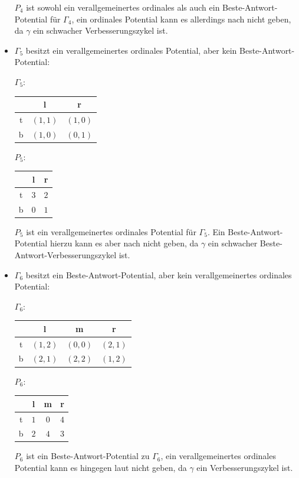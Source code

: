 \begin{bsp}
\begin{itemize}
\begin{center}
\begin{tabular}{c||c|c|c}
				\end{tabular}
			\end{center}
			$P_4$ ist sowohl ein verallgemeinertes ordinales als auch ein Beste-Antwort-Potential für $\Gamma_4$, ein ordinales Potential kann es allerdings nach  nicht geben, da $\gamma$ ein schwacher Verbesserungszykel ist.
		\item $\Gamma_5$ besitzt ein verallgemeinertes ordinales Potential, aber kein Beste-Antwort-Potential:
			\begin{center}
				$\Gamma_5:$ \quad
				\begin{tabular}{c||c|c}
						& l 		& r 		\\\hline\hline
					t	& $(1,1)$	& $(1,0)$	\\\hline
					b	& $(1,0)$	& $(0,1)$ 
				\end{tabular}\hspace{5em}
				$P_5:$ \quad
				\begin{tabular}{c||c|c}
						& l 		& r 		\\\hline\hline
					t	& $3$	& $2$			\\\hline
					b	& $0$	& $1$ 
				\end{tabular}
			\end{center}
		$P_5$ ist ein verallgemeinertes ordinales Potential für $\Gamma_5$. Ein Beste-Antwort-Potential hierzu kann es aber nach  nicht geben, da $\gamma$ ein schwacher Beste-Antwort-Verbesserungszykel ist.
		\item $\Gamma_6$ besitzt ein Beste-Antwort-Potential, aber kein verallgemeinertes ordinales Potential:
			\begin{center}
				$\Gamma_6:$ \quad
				\begin{tabular}{c||c|c|c}
						& l 		& m			& r 		\\\hline\hline
					t	& $(1,2)$	& $(0,0)$	& $(2,1)$	\\\hline
					b	& $(2,1)$	& $(2,2)$ 	& $(1,2)$
				\end{tabular}\hspace{5em}
				$P_6:$ \quad
				\begin{tabular}{c||c|c|c}
						& l 		& m 		& r \\\hline\hline
					t	& $1$	& $0$		& $4$	\\\hline
					b	& $2$	& $4$ 		& $3$
				\end{tabular}
			\end{center}
			$P_6$ ist ein Beste-Antwort-Potential zu $\Gamma_6$, ein verallgemeinertes ordinales Potential kann es hingegen laut  nicht geben, da $\gamma$ ein Verbesserungszykel ist.
	\end{itemize}
\end{bsp}

